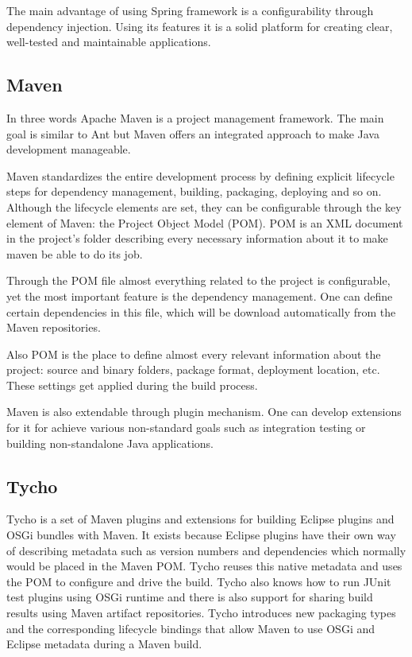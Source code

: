 %
The main advantage of using Spring framework is a configurability through
dependency injection. Using its features it is a solid platform for creating
clear, well-tested and maintainable applications.


\subsection{Maven}
In three words Apache Maven is a project management framework. The main goal is 
similar to Ant but Maven offers an integrated approach to make Java development
manageable. 

Maven standardizes the entire development process by defining explicit lifecycle
steps for dependency management, building, packaging, deploying and so on.
Although the lifecycle elements are set, they can be configurable through the 
key element of Maven: the Project Object Model (POM). POM is an XML document in 
the project's folder describing every necessary information about it to make 
maven be able to do its job. 

Through the POM file almost everything related to the project is configurable,
yet the most important feature is the dependency management. One can define
certain dependencies in this file, which will be download automatically from 
the Maven repositories.

Also POM is the place to define almost every relevant information about the project:
source and binary folders, package format, deployment location, etc. These settings
get applied during the build process.

Maven is also extendable through plugin mechanism. One can develop extensions for it
for achieve various non-standard goals such as integration testing or building 
non-standalone Java applications.

\subsection{Tycho}
Tycho is a set of Maven plugins and extensions for building Eclipse plugins and
OSGi bundles with Maven. It exists because Eclipse plugins have their own way of
describing metadata such as version numbers and dependencies which normally
would be placed in the Maven POM. Tycho reuses this native metadata 
and uses the POM to configure and drive the build. Tycho also knows
how to run JUnit test plugins using OSGi runtime and there is also support for
sharing build results using Maven artifact repositories. Tycho introduces
new packaging types and the corresponding lifecycle bindings that allow Maven to
use OSGi and Eclipse metadata during a Maven build.

